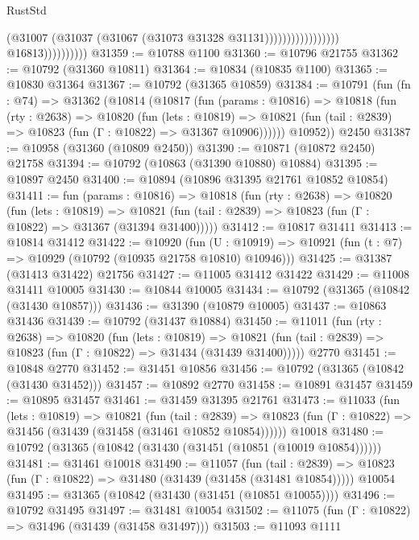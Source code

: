 \begin{lexlean}{RustStd}
\begin{coremodule}
                                                  (@31007
                                                    (@31037
                                                      (@31067 (@31073 @31328 @31131)))))))))))))))))
                        @16813))))))))))
@31359 := @10788 @1100
@31360 := @10796 @21755
@31362 := @10792 (@31360 @10811)
@31364 := @10834 (@10835 @1100)
@31365 := @10830 @31364
@31367 := @10792 (@31365 @10859)
@31384 := @10791
    (fun (fn : @74) =>
    @31362
      (@10814
        (@10817
          (fun (params : @10816) =>
          @10818
            (fun (rty : @2638) =>
            @10820
              (fun (lets : @10819) =>
              @10821 (fun (tail : @2839) => @10823 (fun (Γ : @10822) => @31367 @10906))))))
        @10952))
    @2450
@31387 := @10958 (@31360 (@10809 @2450))
@31390 := @10871 (@10872 @2450) @21758
@31394 := @10792 (@10863 (@31390 @10880) @10884)
@31395 := @10897 @2450
@31400 := @10894 (@10896 @31395 @21761 @10852 @10854)
@31411 := fun (params : @10816) =>
  @10818
    (fun (rty : @2638) =>
    @10820
      (fun (lets : @10819) =>
      @10821 (fun (tail : @2839) => @10823 (fun (Γ : @10822) => @31367 (@31394 @31400)))))
@31412 := @10817 @31411
@31413 := @10814 @31412
@31422 := @10920
    (fun (U : @10919) => @10921 (fun (t : @7) => @10929 (@10792 (@10935 @21758 @10810) @10946)))
@31425 := @31387 (@31413 @31422) @21756
@31427 := @11005 @31412 @31422
@31429 := @11008 @31411 @10005
@31430 := @10844 @10005
@31434 := @10792 (@31365 (@10842 (@31430 @10857)))
@31436 := @31390 (@10879 @10005)
@31437 := @10863 @31436
@31439 := @10792 (@31437 @10884)
@31450 := @11011
    (fun (rty : @2638) =>
    @10820
      (fun (lets : @10819) =>
      @10821 (fun (tail : @2839) => @10823 (fun (Γ : @10822) => @31434 (@31439 @31400)))))
    @2770
@31451 := @10848 @2770
@31452 := @31451 @10856
@31456 := @10792 (@31365 (@10842 (@31430 @31452)))
@31457 := @10892 @2770
@31458 := @10891 @31457
@31459 := @10895 @31457
@31461 := @31459 @31395 @21761
@31473 := @11033
    (fun (lets : @10819) =>
    @10821
      (fun (tail : @2839) =>
      @10823 (fun (Γ : @10822) => @31456 (@31439 (@31458 (@31461 @10852 @10854))))))
    @10018
@31480 := @10792 (@31365 (@10842 (@31430 (@31451 (@10851 (@10019 @10854))))))
@31481 := @31461 @10018
@31490 := @11057
    (fun (tail : @2839) => @10823 (fun (Γ : @10822) => @31480 (@31439 (@31458 (@31481 @10854)))))
    @10054
@31495 := @31365 (@10842 (@31430 (@31451 (@10851 @10055))))
@31496 := @10792 @31495
@31497 := @31481 @10054
@31502 := @11075 (fun (Γ : @10822) => @31496 (@31439 (@31458 @31497)))
@31503 := @11093 @1111

\end{coremodule}
\end{lexlean}
